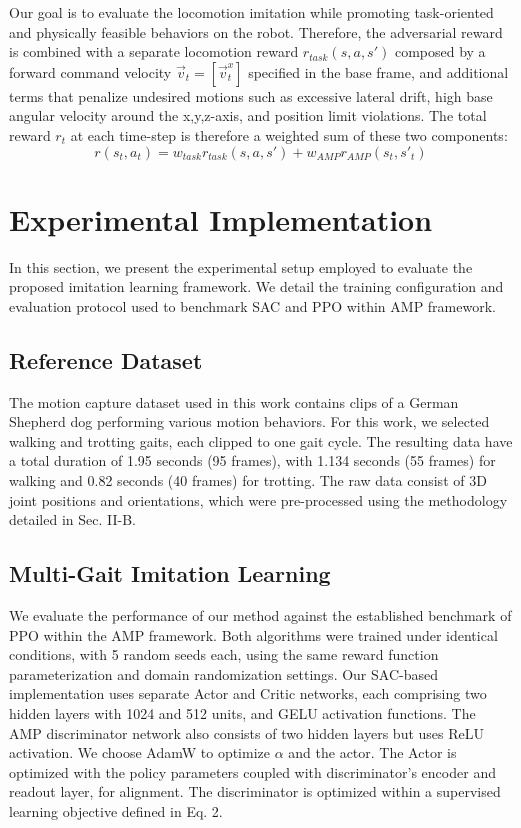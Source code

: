 \documentclass[letterpaper, 10pt, conference]{IEEEtran}
\begin{document}
Our goal is to evaluate the locomotion imitation while promoting task-oriented and physically feasible behaviors on the robot. Therefore, the adversarial reward is combined with a separate locomotion reward $r_{task}(s,a,s')$ composed by a forward command velocity $\vec{v}_{t}=[\vec{v}_{t}^{x}]$ specified in the base frame, and additional terms that penalize undesired motions such as excessive lateral drift, high base angular velocity around the x,y,z-axis, and position limit violations. The total reward $r_{t}$ at each time-step is therefore a weighted sum of these two components:
\begin{equation}
r(s_{t},a_{t})=w_{task} r_{task}(s,a,s') + w_{AMP}r_{AMP}(s_{t},s'_{t})
\end{equation}

\section{Experimental Implementation}

In this section, we present the experimental setup employed to evaluate the proposed imitation learning framework. We detail the training configuration and evaluation protocol used to benchmark SAC and PPO within AMP framework.

\subsection{Reference Dataset}
The motion capture dataset used in this work \cite{Zhang2018} contains clips of a German Shepherd dog performing various motion behaviors. For this work, we selected walking and trotting gaits, each clipped to one gait cycle. The resulting data have a total duration of 1.95 seconds (95 frames), with 1.134 seconds (55 frames) for walking and 0.82 seconds (40 frames) for trotting. The raw data consist of 3D joint positions and orientations, which were pre-processed using the methodology detailed in Sec. II-B.

\subsection{Multi-Gait Imitation Learning}
We evaluate the performance of our method against the established benchmark of PPO within the AMP framework. Both algorithms were trained under identical conditions, with 5 random seeds each, using the same reward function parameterization and domain randomization settings. Our SAC-based implementation uses separate Actor and Critic networks, each comprising two hidden layers with 1024 and 512 units, and GELU activation functions. The AMP discriminator network also consists of two hidden layers but uses ReLU activation. We choose AdamW to optimize $\alpha$ and the actor. The Actor is optimized with the policy parameters coupled with discriminator's encoder and readout layer, for alignment. The discriminator is optimized within a supervised learning objective defined in Eq. 2.
\end{document}
